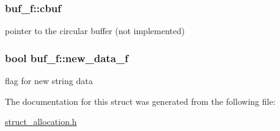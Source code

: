 \subsubsection[{\texorpdfstring{cbuf}{cbuf}}]{ buf\+\_\+f\+::cbuf}\hypertarget{structbuf__f_acd7ea2dab3453e8ef84165772ff427fe}{}\label{structbuf__f_acd7ea2dab3453e8ef84165772ff427fe}
pointer to the circular buffer (not implemented) 
\subsubsection[{\texorpdfstring{new\+\_\+data\+\_\+f}{new_data_f}}]{\setlength{\rightskip}{0pt plus 5cm}bool buf\+\_\+f\+::new\+\_\+data\+\_\+f}\hypertarget{structbuf__f_afddc498a46f464e3c5caf135b1ff0dce}{}\label{structbuf__f_afddc498a46f464e3c5caf135b1ff0dce}
flag for new string data 

The documentation for this struct was generated from the following file\+:\begin{DoxyCompactItemize}
\item 
\hyperlink{struct__allocation_8h}{struct\+\_\+allocation.\+h}\end{DoxyCompactItemize}
